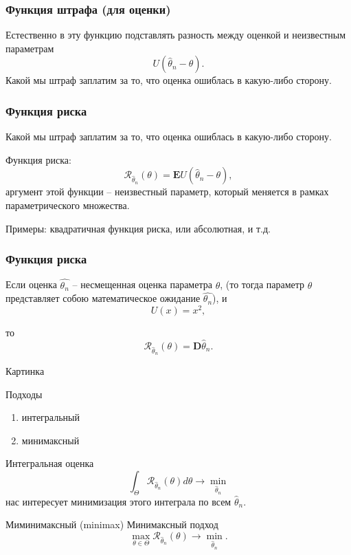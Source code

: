 \begin{frame}
\frametitle{Функция штрафа (для оценки)}
Естественно  в эту функцию
подставлять разность между оценкой и
неизвестным параметрам
$$
U(\hat{\theta}_n - \theta).
$$
Какой мы штраф заплатим за то, что оценка
ошиблась в какую-либо сторону.

\end{frame}

\begin{frame}
\frametitle{Функция риска}
Какой мы штраф заплатим за то, что оценка
ошиблась в какую-либо сторону.


Функция риска:
$$
\mathcal{R}_{\hat{\theta}_n}(\theta) = \mathrm{\mathbf{E}}U(\hat{\theta}_n - \theta),
$$
аргумент этой функции --  неизвестный параметр, который меняется
в рамках параметрического множества.



Примеры: квадратичная функция риска, или
абсолютная, и т.д.
\end{frame}


\begin{frame}
\frametitle{Функция риска}
Если оценка $\hat{\theta_n}$ --
несмещенная оценка параметра $\theta$, 
(то тогда параметр $\theta$ представляет собою математическое ожидание $\hat{\theta_n}$), 
и 
$$U(x)=x^2, $$

то 
$$
\mathcal{R}_{\hat{\theta}_n}(\theta) = \mathrm{\mathbf{D}}\hat{\theta}_n.
$$
\end{frame}



\begin{frame}{Картинка}

\end{frame}

\begin{frame}{Подходы}
\begin{enumerate}
    \item интегральный
    \item минимаксный
\end{enumerate}

\end{frame}

\begin{frame}{Интегральная оценка}
 $$
\int_{\Theta} \mathcal{R}_{\hat{\theta}_n}(\theta) d \theta 
\to \min_{\hat{\theta}_n}
$$
нас интересует  минимизация этого
интеграла  по
всем $\hat{\theta}_n$. 
\end{frame}

\begin{frame}{Миминимаксный (minimax)}
Минимаксный подход
$$
\max_{\theta \in \Theta} \mathcal{R}_{\hat{\theta}_n}(\theta)
\to \min_{\hat{\theta}_n}.
$$
\end{frame}



